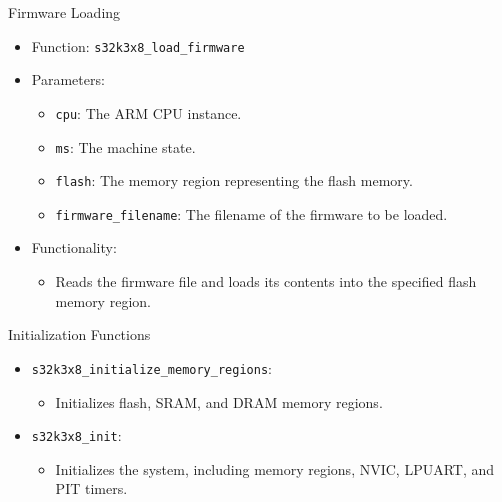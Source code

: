 \begin{frame}{Firmware Loading}
    \begin{itemize}
        \item Function: \texttt{s32k3x8\_load\_firmware}
        \item Parameters:
        \begin{itemize}
            \item \texttt{cpu}: The ARM CPU instance.
            \item \texttt{ms}: The machine state.
            \item \texttt{flash}: The memory region representing the flash memory.
            \item \texttt{firmware\_filename}: The filename of the firmware to be loaded.
        \end{itemize}
        \item Functionality:
        \begin{itemize}
            \item Reads the firmware file and loads its contents into the specified flash memory region.
        \end{itemize}
    \end{itemize}
\end{frame}

\begin{frame}{Initialization Functions}
    \begin{itemize}
        \item \texttt{s32k3x8\_initialize\_memory\_regions}:
        \begin{itemize}
            \item Initializes flash, SRAM, and DRAM memory regions.
        \end{itemize}
        \item \texttt{s32k3x8\_init}:
        \begin{itemize}
            \item Initializes the system, including memory regions, NVIC, LPUART, and PIT timers.
        \end{itemize}
    \end{itemize}
\end{frame}
